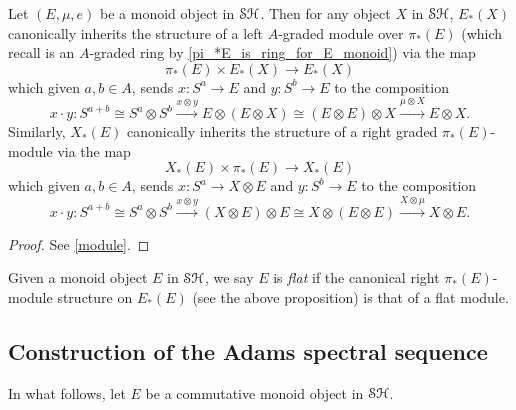 \documentclass[../main.tex]{subfiles}
\begin{document}
\begin{proposition}
	Let $(E,\mu,e)$ be a monoid object in $\mathcal{SH}$. Then for any object $X$ in $\mathcal{SH}$, $E_*(X)$ canonically inherits the structure of a left $A$-graded module over $\pi_*(E)$ (which recall is an $A$-graded ring by \autoref{pi_*E_is_ring_for_E_monoid}) via the map
	\[\pi_*(E)\times E_*(X)\to E_*(X)\]
	which given $a,b\in A$, sends $x:S^a\to E$ and $y:S^b\to E$ to the composition
	\[x\cdot y:S^{a+b}\cong S^a\otimes S^b\xrightarrow{x\otimes y}E\otimes (E\otimes X)\cong(E\otimes E)\otimes X\xrightarrow{\mu\otimes X}E\otimes X.\]
	Similarly, $X_*(E)$ canonically inherits the structure of a right graded $\pi_*(E)$-module via the map
	\[X_*(E)\times\pi_*(E)\to X_*(E)\]
	which given $a,b\in A$, sends $x:S^a\to X\otimes E$ and $y:S^b\to E$ to the composition
	\[x\cdot y:S^{a+b}\cong S^a\otimes S^b\xrightarrow{x\otimes y}(X\otimes E)\otimes E\cong X\otimes(E\otimes E)\xrightarrow{X\otimes\mu}X\otimes E.\]
\end{proposition}
\begin{proof}
	See \autoref{module}.
\end{proof}

\begin{definition}\label{flat}
	Given a monoid object $E$ in $\mathcal{SH}$, we say $E$ is \emph{flat} if the canonical right $\pi_*(E)$-module structure on $E_*(E)$ (see the above proposition) is that of a flat module.
\end{definition}

\subsection{Construction of the Adams spectral sequence}

In what follows, let $E$ be a commutative monoid object in $\mathcal{SH}$.
\end{document}
